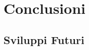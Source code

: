 \chapter{Conclusioni}
\label{chap:Conclusioni}

\section{Sviluppi Futuri}
\label{sec:Sviluppi Futuri}
